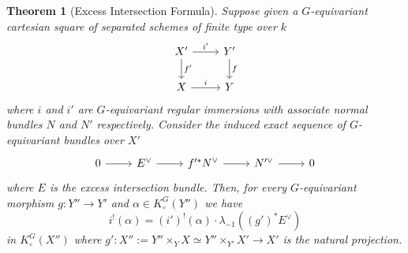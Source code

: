 \documentclass[12pt]{amsart}
\newcommand{\Kgroup}{K_{\circ}}
\newtheorem{Thm}[theorem]{Theorem}
\theoremstyle{definition}
\begin{document}
\begin{Thm}[Excess Intersection Formula]\label{prop: excess intersection formula}
    Suppose given a $G$-equivariant cartesian square of separated schemes of finite type over $k$ 
    \[
    \begin{tikzcd}
        X'\arrow[r,"i'"]\arrow[d,"f'"] & Y'\arrow[d,"f"]\\
        X\arrow[r,"i"] & Y
    \end{tikzcd}
    \]
    where $i$ and $i'$ are $G$-equivariant regular immersions with associate normal bundles $N$ and $N'$ respectively. Consider the induced exact sequence of $G$-equivariant bundles over $X'$
    \[
    \begin{tikzcd}
        0\arrow[r] & E^{\vee} \arrow[r] & f'^*N^{\vee}\arrow[r] & N'^{\vee}\arrow[r] & 0
    \end{tikzcd}
    \]
    where $E$ is the excess intersection bundle. Then, for every $G$-equivariant morphism $g:Y'' \rightarrow Y'$ and $\alpha\in\Kgroup^G(Y'')$ we have
    \begin{equation}
       i^! (\alpha) = (i')^!(\alpha) \cdot \lambda_{-1}((g')^{*}E^{\vee})
    \end{equation}
    in $\Kgroup^G(X'')$ where $g':X'':=Y''\times_{Y} X \simeq Y''\times_{Y'} X' \rightarrow X'$ is the natural projection.
\end{Thm}
\end{document}
